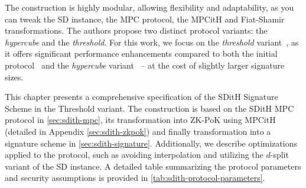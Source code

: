 \documentclass[11pt]{report}
\theoremstyle{definition}
\theoremstyle{plain}
\begin{document}
The construction is highly modular, allowing flexibility and adaptability, as you can tweak the SD instance, the MPC protocol, the MPCitH and Fiat-Shamir transformations. The authors propose two distinct protocol variants: the \textit{hypercube} and the \textit{threshold}. For this work, we focus on the \textit{threshold} variant~\cite{aguilarsyndrome11,feneuil2023threshold,feneuil2023threshold2}, as it offers significant performance enhancements compared to both the initial protocol~\cite{feneuil2022syndrome} and the \textit{hypercube} variant~\cite{aguilarsyndrome11,aguilar2023return,feneuil2023threshold2} -- at the cost of slightly larger signature sizes.

This chapter presents a comprehensive specification of the SDitH Signature Scheme in the Threshold variant. The construction is based on the SDitH MPC protocol in \autoref{sec:sdith-mpc}, its transformation into ZK-PoK using MPCitH (detailed in Appendix \ref{sec:sdith-zkpok}) and finally transformation into a signature scheme in \autoref{sec:sdith-signature}. Additionally, we describe optimizations applied to the protocol, such as avoiding interpolation and utilizing the $d$-split variant of the SD instance. A detailed table summarizing the protocol parameters and security assumptions is provided in \autoref{tab:sdith-protocol-parameters}.
\end{document}
